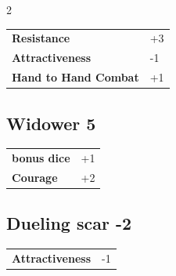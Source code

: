 \begin{multicols}{2}
\begin{tcolorbox}
\vspace{3mm}

\begin{tabular}{@{}ll@{}}
    \textbf{Resistance} & +3\\
    \textbf{Attractiveness} & -1\\
    \textbf{Hand to Hand Combat} & +1\\
\end{tabular}


\end{tcolorbox}

\begin{tcolorbox}
    \subsection*{Widower \hfill \small{5 }}
    \tcblower




\begin{tabular}{@{}ll@{}}
    \textbf{bonus dice} & +1\\
    \textbf{Courage} & +2\\
\end{tabular}


\end{tcolorbox}

\begin{tcolorbox}
    \subsection*{Dueling scar \hfill \small{-2 }}
    \tcblower




\begin{tabular}{@{}ll@{}}
    \textbf{Attractiveness} & -1\\
\end{tabular}



\end{tcolorbox}
\end{multicols}
